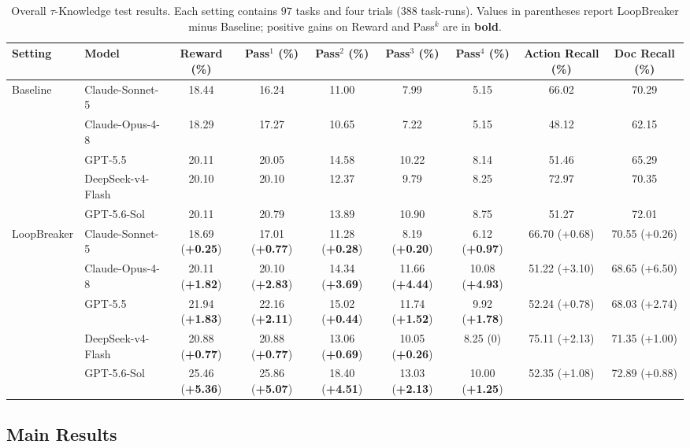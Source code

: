 \documentclass[letterpaper]{article}
\begin{document}
\begin{table}[!t]
\centering
\small
\setlength{\tabcolsep}{1pt}
\renewcommand{\arraystretch}{1.05}
\begin{tabular*}{\textwidth}{@{\extracolsep{\fill}}ll*{7}{c}@{}}
\toprule
Setting & Model & Reward (\%) & Pass$^1$ (\%) & Pass$^2$ (\%) & Pass$^3$ (\%) & Pass$^4$ (\%) & Action Recall (\%) & Doc Recall (\%) \\
\midrule
\multirow{5}{*}{Baseline} & Claude-Sonnet-5  & 18.44 & 16.24 & 11.00 & 7.99 & 5.15 & 66.02 & 70.29 \\
 & Claude-Opus-4-8  & 18.29 & 17.27 & 10.65 & 7.22 & 5.15 & 48.12 & 62.15 \\
 & GPT-5.5 & 20.11 & 20.05 & 14.58 & 10.22 & 8.14 & 51.46 & 65.29 \\
 & DeepSeek-v4-Flash & 20.10 & 20.10 & 12.37 & 9.79 & 8.25 & 72.97 & 70.35 \\
 & GPT-5.6-Sol  & 20.11 & 20.79 & 13.89 & 10.90 & 8.75 & 51.27 & 72.01 \\
\midrule
\multirow{5}{*}{LoopBreaker} & Claude-Sonnet-5  & 18.69 (\textbf{+0.25}) & 17.01 (\textbf{+0.77}) & 11.28 (\textbf{+0.28}) & 8.19 (\textbf{+0.20}) & 6.12 (\textbf{+0.97}) & 66.70 (+0.68) & 70.55 (+0.26) \\
 & Claude-Opus-4-8 & 20.11 (\textbf{+1.82}) & 20.10 (\textbf{+2.83}) & 14.34 (\textbf{+3.69}) & 11.66 (\textbf{+4.44}) & 10.08 (\textbf{+4.93}) & 51.22 (+3.10) & 68.65 (+6.50) \\
 & GPT-5.5 & 21.94 (\textbf{+1.83}) & 22.16 (\textbf{+2.11}) & 15.02 (\textbf{+0.44}) & 11.74 (\textbf{+1.52}) & 9.92 (\textbf{+1.78}) & 52.24 (+0.78) & 68.03 (+2.74) \\
 & DeepSeek-v4-Flash & 20.88 (\textbf{+0.77}) & 20.88 (\textbf{+0.77}) & 13.06 (\textbf{+0.69}) & 10.05 (\textbf{+0.26}) & 8.25 (0) & 75.11 (+2.13) & 71.35 (+1.00) \\
 & GPT-5.6-Sol  & 25.46 (\textbf{+5.36}) & 25.86 (\textbf{+5.07}) & 18.40 (\textbf{+4.51}) & 13.03 (\textbf{+2.13}) & 10.00 (\textbf{+1.25}) & 52.35 (+1.08) & 72.89 (+0.88) \\
\bottomrule
\end{tabular*}
\renewcommand{\arraystretch}{1.0}
\caption{Overall $\tau$-Knowledge test results. Each setting contains $97$ tasks and four trials ($388$ task-runs). Values in parentheses report LoopBreaker minus Baseline; positive gains on Reward and Pass$^k$ are in \textbf{bold}.}
\label{tab:tau-main}
\end{table}

\subsection*{Main Results}
\end{document}
